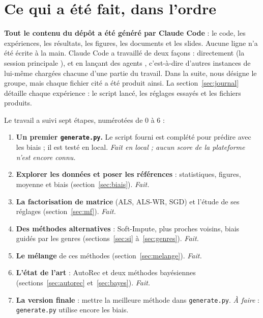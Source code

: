 \documentclass[11pt,a4paper]{article}
\begin{document}
\section{Ce qui a été fait, dans l'ordre}

\textbf{Tout le contenu du dépôt a été généré par Claude Code} : le code, les expériences,
les résultats, les figures, les documents et les slides. Aucune ligne n'a été écrite à la
main. Claude Code a travaillé de deux façons : directement (la \og session principale \fg),
et en lançant des \og agents \fg, c'est-à-dire d'autres instances de lui-même chargées
chacune d'une partie du travail. Dans la suite, \og nous \fg désigne le groupe, mais
chaque fichier cité a été produit ainsi. La section~\ref{sec:journal} détaille chaque
expérience : le script lancé, les réglages essayés et les fichiers produits.

Le travail a suivi sept étapes, numérotées de 0 à 6 :

\begin{enumerate}[leftmargin=*, label=\textbf{\arabic*.}, start=0]
  \item \textbf{Un premier \texttt{generate.py}.} Le script fourni est complété pour
        prédire avec les biais ; il est testé en local. \emph{Fait en local ; aucun score
        de la plateforme n'est encore connu.}
  \item \textbf{Explorer les données et poser les références} : statistiques, figures,
        moyenne et biais (section~\ref{sec:biais}). \emph{Fait.}
  \item \textbf{La factorisation de matrice} (ALS, ALS-WR, SGD) et l'étude de ses réglages
        (section~\ref{sec:mf}). \emph{Fait.}
  \item \textbf{Des méthodes alternatives} : Soft-Impute, plus proches voisins, biais
        guidés par les genres (sections~\ref{sec:si} à~\ref{sec:genres}). \emph{Fait.}
  \item \textbf{Le mélange} de ces méthodes (section~\ref{sec:melange}). \emph{Fait.}
  \item \textbf{L'état de l'art} : AutoRec et deux méthodes bayésiennes
        (sections~\ref{sec:autorec} et~\ref{sec:bayes}). \emph{Fait.}
  \item \textbf{La version finale} : mettre la meilleure méthode dans \texttt{generate.py}.
        \emph{À faire} : \texttt{generate.py} utilise encore les biais.
\end{enumerate}
\end{document}
